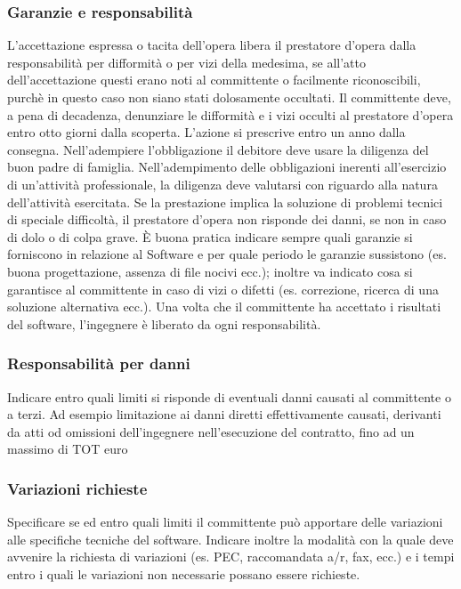 \subsubsection{Garanzie e responsabilità}
L'accettazione espressa o tacita dell'opera libera il prestatore d'opera dalla responsabilità per difformità o per vizi della
medesima, se all'atto dell'accettazione questi erano noti al committente o facilmente riconoscibili, purchè in questo
caso non siano stati dolosamente occultati.\newline
Il committente deve, a pena di decadenza, denunziare le difformità e i vizi occulti al prestatore d'opera entro otto giorni
dalla scoperta. L'azione si prescrive entro un anno dalla consegna.\newline
Nell'adempiere l'obbligazione il debitore deve usare la diligenza del buon padre di famiglia. Nell'adempimento delle obbligazioni
inerenti all'esercizio di un'attività professionale, la diligenza deve valutarsi con riguardo alla natura dell'attività esercitata.\newline
Se la prestazione implica la soluzione di problemi tecnici di speciale difficoltà, il prestatore d'opera non risponde dei danni,
se non in caso di dolo o di colpa grave.\newline
È buona pratica indicare sempre quali garanzie si forniscono in relazione al Software e per quale periodo le garanzie sussistono (es.
buona progettazione, assenza di file nocivi ecc.); inoltre va indicato cosa si garantisce al committente in caso di vizi o difetti
(es. correzione, ricerca di una soluzione alternativa ecc.).\newline
Una volta che il committente ha accettato i risultati del software, l'ingegnere è liberato da ogni responsabilità.

\subsubsection{Responsabilità per danni}
Indicare entro quali limiti si risponde di eventuali danni causati al committente o a terzi. Ad esempio limitazione ai danni
diretti effettivamente causati, derivanti da atti od omissioni dell'ingegnere nell'esecuzione del contratto, fino ad un massimo
di TOT euro

\subsubsection{Variazioni richieste}
Specificare se ed entro quali limiti il committente può apportare delle variazioni alle specifiche tecniche del software. Indicare inoltre la modalità
con la quale deve avvenire la richiesta di variazioni (es. PEC, raccomandata a/r, fax, ecc.) e i tempi entro i quali
le variazioni non necessarie possano essere richieste.

